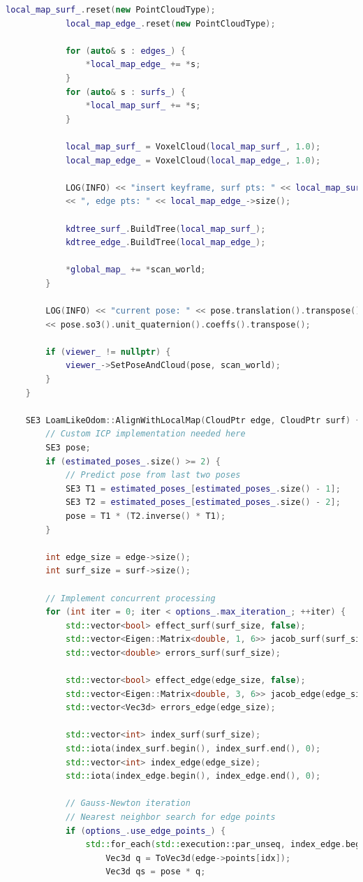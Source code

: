 \begin{lstlisting}[language=c++,caption=src/ch7/loam-like/loam\_like\_odom.cc]
			local_map_surf_.reset(new PointCloudType);
			local_map_edge_.reset(new PointCloudType);
			
			for (auto& s : edges_) {
				*local_map_edge_ += *s;
			}
			for (auto& s : surfs_) {
				*local_map_surf_ += *s;
			}
			
			local_map_surf_ = VoxelCloud(local_map_surf_, 1.0);
			local_map_edge_ = VoxelCloud(local_map_edge_, 1.0);
			
			LOG(INFO) << "insert keyframe, surf pts: " << local_map_surf_->size()
			<< ", edge pts: " << local_map_edge_->size();
			
			kdtree_surf_.BuildTree(local_map_surf_);
			kdtree_edge_.BuildTree(local_map_edge_);
			
			*global_map_ += *scan_world;
		}
		
		LOG(INFO) << "current pose: " << pose.translation().transpose() << ", "
		<< pose.so3().unit_quaternion().coeffs().transpose();
		
		if (viewer_ != nullptr) {
			viewer_->SetPoseAndCloud(pose, scan_world);
		}
	}
	
	SE3 LoamLikeOdom::AlignWithLocalMap(CloudPtr edge, CloudPtr surf) {
		// Custom ICP implementation needed here
		SE3 pose;
		if (estimated_poses_.size() >= 2) {
			// Predict pose from last two poses
			SE3 T1 = estimated_poses_[estimated_poses_.size() - 1];
			SE3 T2 = estimated_poses_[estimated_poses_.size() - 2];
			pose = T1 * (T2.inverse() * T1);
		}
		
		int edge_size = edge->size();
		int surf_size = surf->size();
		
		// Implement concurrent processing
		for (int iter = 0; iter < options_.max_iteration_; ++iter) {
			std::vector<bool> effect_surf(surf_size, false);
			std::vector<Eigen::Matrix<double, 1, 6>> jacob_surf(surf_size);  // 1D residual for planes
			std::vector<double> errors_surf(surf_size);
			
			std::vector<bool> effect_edge(edge_size, false);
			std::vector<Eigen::Matrix<double, 3, 6>> jacob_edge(edge_size);  // 3D residual for edges
			std::vector<Vec3d> errors_edge(edge_size);
			
			std::vector<int> index_surf(surf_size);
			std::iota(index_surf.begin(), index_surf.end(), 0);
			std::vector<int> index_edge(edge_size);
			std::iota(index_edge.begin(), index_edge.end(), 0);
			
			// Gauss-Newton iteration
			// Nearest neighbor search for edge points
			if (options_.use_edge_points_) {
				std::for_each(std::execution::par_unseq, index_edge.begin(), index_edge.end(), [&](int idx) {
					Vec3d q = ToVec3d(edge->points[idx]);
					Vec3d qs = pose * q;
					

\end{lstlisting}
